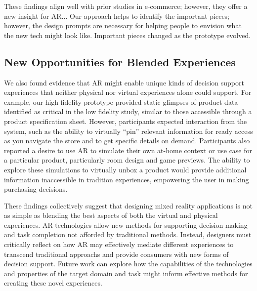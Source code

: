 These findings align well with prior studies in e-commerce; however, they offer a new insight for AR... Our approach helps to identify the important pieces; however, the design prompts are necessary for helping people to envision what the new tech might look like. Important pieces changed as the prototype evolved. 

\subsection{New Opportunities for Blended Experiences}
We also found evidence that AR might enable unique kinds of decision support experiences that neither physical nor virtual experiences alone could support. For example, our high fidelity prototype provided static glimpses of product data identified as critical in the low fidelity study, similar to those accessible through a product specification sheet. However, participants expected interaction from the system, such as the ability to virtually ``pin'' relevant information for ready access as you navigate the store and to get specific details on demand. 
Participants also reported a desire to use AR to simulate their own at-home context or use case for a particular product, particularly room design and game previews. The ability to explore these simulations to virtually unbox a product would provide additional information inaccessible in tradition experiences, empowering the user in making purchasing decisions. 

These findings collectively suggest that designing mixed reality applications is not as simple as blending the best aspects of both the virtual and physical experiences. AR technologies allow new methods for supporting decision making and task completion not afforded by traditional methods. Instead, designers must critically reflect on how AR may effectively mediate different experiences to transcend traditional approachs and provide consumers with new forms of decision support. Future work can explore how the capabilities of the technologies and properties of the target domain and task might inform effective methods for creating these novel experiences.

